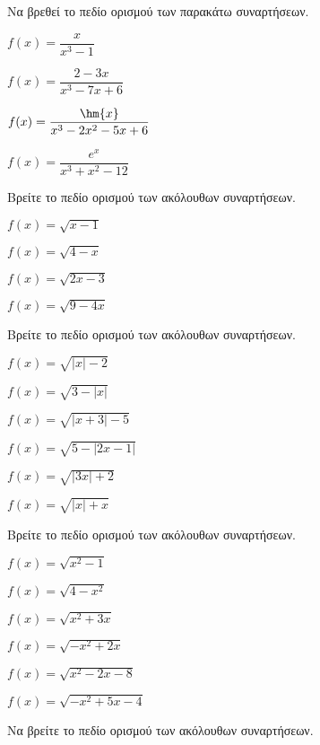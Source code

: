 \documentclass[11pt,a4paper,twocolumn]{article}
\begin{document}
\begin{askhseis}
\begin{multicols}{2}
\end{multicols}
\item Να βρεθεί το πεδίο ορισμού των παρακάτω συναρτήσεων.
\begin{alist}
\item $f(x)=\dfrac{x}{x^3-1}$
\item $f(x)=\dfrac{2-3x}{x^3-7x+6}$
\item $f(x)=\dfrac{\hm{x}}{x^3-2x^2-5x+6}$
\item $f(x)=\dfrac{e^x}{x^3+x^2-12}$
\end{alist}
\item Βρείτε το πεδίο ορισμού των ακόλουθων συναρτήσεων.
\begin{multicols}{2}
\begin{alist}
\item $f(x)=\sqrt{x-1}$
\item $f(x)=\sqrt{4-x}$
\item $f(x)=\sqrt{2x-3}$
\item $f(x)=\sqrt{9-4x}$
\end{alist}
\end{multicols}
\item Βρείτε το πεδίο ορισμού των ακόλουθων συναρτήσεων.
\begin{multicols}{2}
\begin{alist}
\item $f(x)=\sqrt{|x|-2}$
\item $f(x)=\sqrt{3-|x|}$
\item $f(x)=\sqrt{|x+3|-5}$
\item $f(x)=\sqrt{5-|2x-1|}$
\item $f(x)=\sqrt{|3x|+2}$
\item $f(x)=\sqrt{|x|+x}$
\end{alist}
\end{multicols}
\item Βρείτε το πεδίο ορισμού των ακόλουθων συναρτήσεων.
\begin{multicols}{2}
\begin{alist}
\item $f(x)=\sqrt{x^2-1}$
\item $f(x)=\sqrt{4-x^2}$
\item $f(x)=\sqrt{x^2+3x}$
\item $f(x)=\sqrt{-x^2+2x}$
\item $f(x)=\sqrt{x^2-2x-8}$
\item $f(x)=\sqrt{-x^2+5x-4}$
\end{alist}
\end{multicols}
\item Να βρείτε το πεδίο ορισμού των ακόλουθων συναρτήσεων.

\end{askhseis}
\end{document}
